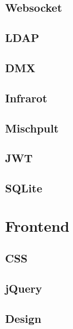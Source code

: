 \hypertarget{websocket}{%
\subsection{Websocket}\label{websocket}}

\hypertarget{ldap}{%
\subsection{LDAP}\label{ldap}}

\hypertarget{dmx}{%
\subsection{DMX}\label{dmx}}

\hypertarget{infrarot}{%
\subsection{Infrarot}\label{infrarot}}

\hypertarget{mischpult}{%
\subsection{Mischpult}\label{mischpult}}

\hypertarget{jwt}{%
\subsection{JWT}\label{jwt}}

\hypertarget{sqlite}{%
\subsection{SQLite}\label{sqlite}}

\hypertarget{frontend}{%
\section{Frontend}\label{frontend}}

\hypertarget{css}{%
\subsection{CSS}\label{css}}

\hypertarget{jquery}{%
\subsection{jQuery}\label{jquery}}

\hypertarget{design}{%
\subsection{Design}\label{design}}

